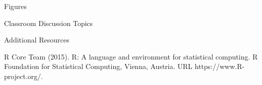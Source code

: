 \begin{frame}[t]
\begin{columns}[t]
\begin{column}{\onecolwid}
\begin{alertblock}{Figures}
\begin{figure}[H]
	\label{fig:Figure1}
\end{figure}
\end{alertblock}
\begin{alertblock}{Classroom Discussion Topics}
\end{alertblock}
\begin{alertblock}{Additional Resources}
\begin{enumerate}
\end{enumerate}
\end{alertblock}

\begin{thebibliography}{00}
\footnotesize		 		
{}R Core Team (2015). 
\newblock R: A language and environment for statistical computing. R Foundation for Statistical Computing, Vienna, Austria.
\newblock URL https://www.R-project.org/.		
\end{thebibliography}
\end{column}
\end{columns}
\end{frame}

